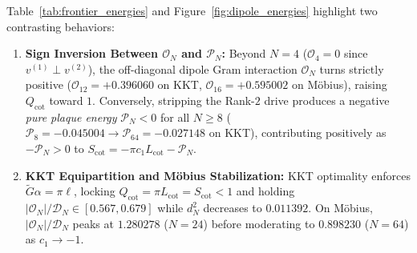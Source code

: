 \documentclass[10pt,a4paper]{article}
\theoremstyle{definition}
\begin{document}
Table~\ref{tab:frontier_energies} and Figure~\ref{fig:dipole_energies} highlight two contrasting behaviors:
\begin{enumerate}[leftmargin=1.8em,itemsep=2pt]
\item \textbf{Sign Inversion Between $\mathcal{O}_N$ and $\mathcal{P}_N$:} Beyond $N=4$ ($\mathcal{O}_4 = 0$ since $v^{(1)} \perp v^{(2)}$), the off-diagonal dipole Gram interaction $\mathcal{O}_N$ turns strictly positive ($\mathcal{O}_{12} = +0.396060$ on KKT, $\mathcal{O}_{16} = +0.595002$ on M\"obius), raising $Q_{\mathrm{cot}}$ toward $1$. Conversely, stripping the Rank-$2$ drive produces a negative \emph{pure plaque energy} $\mathcal{P}_N < 0$ for all $N \ge 8$ ($\mathcal{P}_8 = -0.045004 \to \mathcal{P}_{64} = -0.027148$ on KKT), contributing positively as $-\mathcal{P}_N > 0$ to $S_{\mathrm{cot}} = -\pi c_1 L_{\mathrm{cot}} - \mathcal{P}_N$.
\item \textbf{KKT Equipartition and M\"obius Stabilization:} KKT optimality enforces $\widetilde{G}\alpha = \pi\ell$, locking $Q_{\mathrm{cot}} = \pi L_{\mathrm{cot}} = S_{\mathrm{cot}} < 1$ and holding $|\mathcal{O}_N|/\mathcal{D}_N \in [0.567, 0.679]$ while $d_N^2$ decreases to $0.011392$. On M\"obius, $|\mathcal{O}_N|/\mathcal{D}_N$ peaks at $1.280278$ ($N=24$) before moderating to $0.898230$ ($N=64$) as $c_1 \to -1$.
\end{enumerate}
\end{document}
